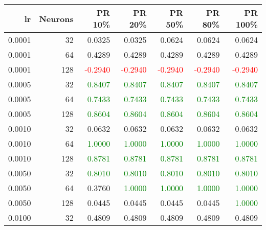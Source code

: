 \begin{tabular}{rrrrrrr}
\toprule
lr & Neurons & PR 10\% & PR 20\% & PR 50\% & PR 80\% & PR 100\% \\
\midrule
0.0001 & 32 & \textcolor{blu} {0.0325} & \textcolor{blu} {0.0325} & \textcolor{blu} {0.0624} & \textcolor{blu} {0.0624} & \textcolor{blu} {0.0624} \\
0.0001 & 64 & \textcolor{blu} {0.4289} & \textcolor{blu} {0.4289} & \textcolor{blu} {0.4289} & \textcolor{blu} {0.4289} & \textcolor{blu} {0.4289} \\
0.0001 & 128 & \textcolor{red} {-0.2940} & \textcolor{red} {-0.2940} & \textcolor{red} {-0.2940} & \textcolor{red} {-0.2940} & \textcolor{red} {-0.2940} \\
0.0005 & 32 & \textcolor{green} {0.8407} & \textcolor{green} {0.8407} & \textcolor{green} {0.8407} & \textcolor{green} {0.8407} & \textcolor{green} {0.8407} \\
0.0005 & 64 & \textcolor{green} {0.7433} & \textcolor{green} {0.7433} & \textcolor{green} {0.7433} & \textcolor{green} {0.7433} & \textcolor{green} {0.7433} \\
0.0005 & 128 & \textcolor{green} {0.8604} & \textcolor{green} {0.8604} & \textcolor{green} {0.8604} & \textcolor{green} {0.8604} & \textcolor{green} {0.8604} \\
0.0010 & 32 & \textcolor{blu} {0.0632} & \textcolor{blu} {0.0632} & \textcolor{blu} {0.0632} & \textcolor{blu} {0.0632} & \textcolor{blu} {0.0632} \\
0.0010 & 64 & \textcolor{green} {1.0000} & \textcolor{green} {1.0000} & \textcolor{green} {1.0000} & \textcolor{green} {1.0000} & \textcolor{green} {1.0000} \\
0.0010 & 128 & \textcolor{green} {0.8781} & \textcolor{green} {0.8781} & \textcolor{green} {0.8781} & \textcolor{green} {0.8781} & \textcolor{green} {0.8781} \\
0.0050 & 32 & \textcolor{green} {0.8010} & \textcolor{green} {0.8010} & \textcolor{green} {0.8010} & \textcolor{green} {0.8010} & \textcolor{green} {0.8010} \\
0.0050 & 64 & \textcolor{blu} {0.3760} & \textcolor{green} {1.0000} & \textcolor{green} {1.0000} & \textcolor{green} {1.0000} & \textcolor{green} {1.0000} \\
0.0050 & 128 & \textcolor{blu} {0.0445} & \textcolor{blu} {0.0445} & \textcolor{blu} {0.0445} & \textcolor{blu} {0.0445} & \textcolor{green} {1.0000} \\
0.0100 & 32 & \textcolor{blu} {0.4809} & \textcolor{blu} {0.4809} & \textcolor{blu} {0.4809} & \textcolor{blu} {0.4809} & \textcolor{blu} {0.4809} \\

\end{tabular}
